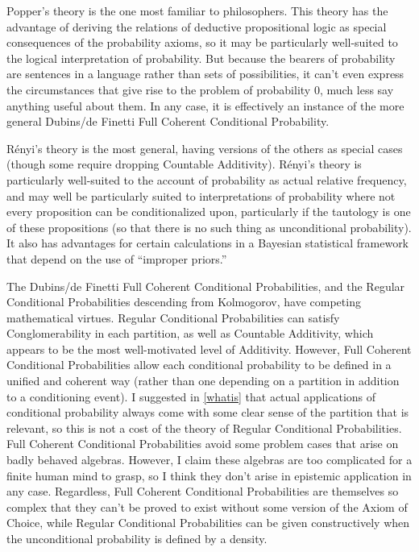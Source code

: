 Popper's theory is the one most familiar to philosophers. This theory has the advantage of deriving the relations of deductive propositional logic as special consequences of the probability axioms, so it may be particularly well-suited to the logical interpretation of probability. But because the bearers of probability are sentences in a language rather than sets of possibilities, it can't even express the circumstances that give rise to the problem of probability $0$, much less say anything useful about them. In any case, it is effectively an instance of the more general Dubins/de Finetti Full Coherent Conditional Probability.

R\'{e}nyi's theory is the most general, having versions of the others as special cases (though some require dropping Countable Additivity). R\'{e}nyi's theory is particularly well-suited to the account of probability as actual relative frequency, and may well be particularly suited to interpretations of probability where not every proposition can be conditionalized upon, particularly if the tautology is one of these propositions (so that there is no such thing as unconditional probability). It also has advantages for certain calculations in a Bayesian statistical framework that depend on the use of ``improper priors.''

The Dubins/de Finetti Full Coherent Conditional Probabilities, and the Regular Conditional Probabilities descending from Kolmogorov, have competing mathematical virtues. Regular Conditional Probabilities can satisfy Conglomerability in each partition, as well as Countable Additivity, which appears to be the most well-motivated level of Additivity. However, Full Coherent Conditional Probabilities allow each conditional probability to be defined in a unified and coherent way (rather than one depending on a partition in addition to a conditioning event). I suggested in \autoref{whatis} that actual applications of conditional probability always come with some clear sense of the partition that is relevant, so this is not a cost of the theory of Regular Conditional Probabilities. Full Coherent Conditional Probabilities avoid some problem cases that arise on badly behaved algebras. However, I claim these algebras are too complicated for a finite human mind to grasp, so I think they don't arise in epistemic application in any case. Regardless, Full Coherent Conditional Probabilities are themselves so complex that they can't be proved to exist without some version of the Axiom of Choice, while Regular Conditional Probabilities can be given constructively when the unconditional probability is defined by a density.

